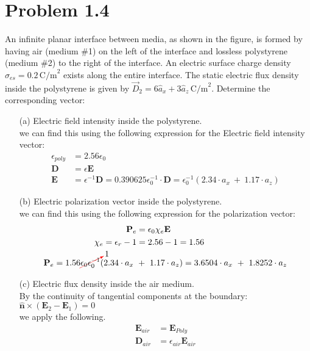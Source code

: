 \documentclass[12pt]{article}
\begin{document}
\section*{Problem 1.4}
An infinite planar interface between media, as shown in the figure, is formed by having air (medium \#1) on the left of the interface and lossless polystyrene (medium \#2) to the right of the interface. An electric surface charge density \( \sigma_{es} = 0.2 \, \text{C/m}^2 \) exists along the entire interface. The static electric flux density inside the polystyrene is given by \( \vec{D}_2 = 6\hat{a}_x + 3\hat{a}_z \, \text{C/m}^2 \).
Determine the corresponding vector:
\begin{itemize}
\item[(a)] Electric field intensity inside the polystyrene. \\
  we can find this using the following expression for the Electric field intensity vector:
  \begin{align*}
    \epsilon_{poly} &= 2.56\epsilon_0 \\
    \mathbf{D} &= \epsilon\mathbf{E}\\
    \mathbf{E} &= \epsilon^{-1}\mathbf{D} = 0.390625\epsilon_0^{-1}\cdot\mathbf{D} = \epsilon_0^{-1} (2.34\cdot a_x\ +\ 1.17\cdot a_z)
  \end{align*}
\item[(b)] Electric polarization vector inside the polystyrene.\\ 
  we can find this using the following expression for the polarization vector:
  \begin{align*}
    \mathbf{P}_e &= \epsilon_0\chi_e\mathbf{E}\\
    \chi_e = \epsilon_r- 1 &= 2.56 - 1 = 1.56 \\
    \mathbf{P}_e = 1.56\textcolor{red}{\cancelto{\textcolor{black}{1}}{\textcolor{black}{\epsilon_0\epsilon_0^{-1}}}} (2.34\cdot a_x\ &+\ 1.17\cdot a_z) = 3.6504\cdot a_x\ +\ 1.8252\cdot a_z 
  \end{align*}
\item[(c)] Electric flux density inside the air medium.\\ 
  By the continuity of tangential components at the boundary: \\
  $\mathbf{\hat n}\times(\mathbf{E}_2 - \mathbf{E}_1) = 0$\\
  we apply the following.
  \begin{align*}
    \mathbf{E}_{air} &= \mathbf{E}_{Poly}\\
    \mathbf{D}_{air} &= \epsilon_{air}\mathbf{E}_{air}\\

\end{align*}
\end{itemize}
\end{document}
